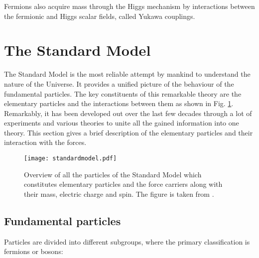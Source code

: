 Fermions also acquire mass through the Higgs mechanism by interactions between the fermionic and Higgs scalar fields, called Yukawa couplings.~\cite{halzen}




















\section{The Standard Model}%
\label{sec:theory:standardmodel}
The Standard Model is the most reliable attempt by mankind to understand the nature of the Universe. It provides a unified picture of the behaviour of the fundamental particles.  The key constituents of this remarkable theory are the elementary particles and the interactions between them as shown in Fig. \ref{fig:theory:standardmodel}. Remarkably, it has been developed out over the last few decades through a lot of experiments and various theories to unite all the gained information into one theory. This section gives a brief description of the elementary particles and their interaction with the forces.


\begin{figure}[hbt!]
	\centering
	\texttt{[image: standardmodel.pdf]}
	\caption{Overview of all the particles of the Standard Model which constitutes elementary particles and the force carriers along with their mass, electric charge and spin. The figure is taken from \cite{standardmodelpicture}.}
	\label{fig:theory:standardmodel}
\end{figure}


\subsection{Fundamental particles}%
\label{sec:theory:standardmodel:fundamentalparticles}
Particles are divided into different subgroups, where the primary classification is fermions or bosons:

